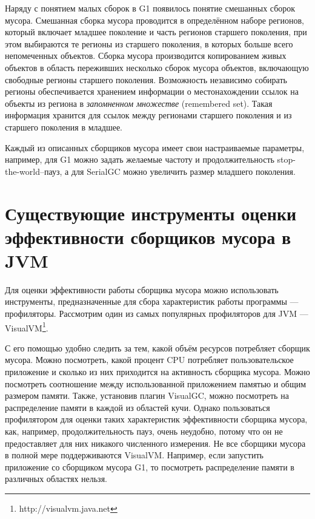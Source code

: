 Наряду с понятием малых сборок в G1 появилось понятие смешанных сборок мусора. Смешанная сборка мусора проводится в определённом
наборе регионов, который включает младшее поколение и часть регионов старшего поколения, при 
этом выбираются те регионы из старшего поколения, в которых больше всего непомеченных объектов.
Сборка мусора производится копированием живых объектов в область переживших несколько сборок мусора объектов,
включающую свободные регионы старшего поколения. Возможность независимо 
собирать регионы обеспечивается хранением информации о местонахождении ссылок на объекты
из региона в \emph{запомненном множестве} (remembered set). Такая информация хранится для ссылок между 
регионами старшего поколения и из старшего поколения в младшее.

Каждый из описанных сборщиков мусора имеет свои настраиваемые параметры, например, для G1
можно задать желаемые частоту и продолжительность stop-the-world--пауз, а для SerialGC
можно увеличить размер младшего поколения. 

\section{Существующие инструменты оценки\\эффективности сборщиков мусора в JVM}

Для оценки эффективности работы сборщика мусора можно использовать инструменты, 
предназначенные для сбора характеристик работы программы --- профиляторы. Рассмотрим 
один из самых популярных профиляторов для JVM --- VisualVM\footnote{http://visualvm.java.net}.

С его помощью удобно следить за тем, какой объём ресурсов потребляет сборщик мусора. Можно посмотреть,
какой процент CPU потребляет пользовательское приложение и сколько из них приходится
на активность сборщика мусора. Можно посмотреть соотношение между использованной
приложением памятью и общим размером памяти. Также, установив плагин VisualGC, можно
посмотреть на распределение памяти в каждой из областей кучи. Однако пользоваться 
профилятором для оценки таких характеристик эффективности сборщика мусора, как, например,
продолжительность пауз, очень неудобно, потому что он не предоставляет для них 
никакого численного измерения. Не все сборщики мусора в полной мере поддерживаются 
VisualVM. Например, если запустить приложение со сборщиком мусора G1, то посмотреть 
распределение памяти в различных областях нельзя.

